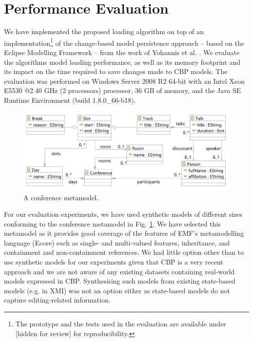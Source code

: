 \documentclass{llncs}
\begin{document}


\section{Performance Evaluation}
\label{sec:performance_evaluation}
We have implemented the proposed loading algorithm on top of an implementation\footnote{The prototype and the tests used in the evaluation are available under [hidden for review] for reproducibility. %
} of the change-based model persistence approach -- based on the Eclipse Modelling Framework -- from the work of Yohannis et al. \cite{yohannis2017turning}. We evaluate the algorithms model loading  performance, as well as its memory footprint and its impact on the time required to save changes made to CBP models. The evaluation was performed on Windows Server 2008 R2 64-bit with an Intel Xeon E5530 @2.40 GHz (2 processors) processor, 36 GB of memory, and the Java SE Runtime Environment (build 1.8.0\_66-b18).

\begin{figure}[htbp]
    \centering
    \includegraphics[width=0.9\linewidth]{conference_metamodel}
    \caption{A conference metamodel.}   
    \label{fig:node_metamodel}
\end{figure}

For our evaluation experiments, we have used synthetic models of different sizes conforming to the conference metamodel in Fig. \ref{fig:node_metamodel}. We have selected this metamodel as it provides good coverage of the features of EMF's metamodelling language (Ecore) such as single- and multi-valued features, inheritance, and containment and non-containment references. We had little option other than to use synthetic models for our experiments given that CBP is a very recent approach and we are not aware of any existing datasets containing real-world models expressed in CBP. Synthesising such models from existing state-based models (e.g. in XMI) was not an option either as state-based models do not capture editing-related information.    
\end{document}
